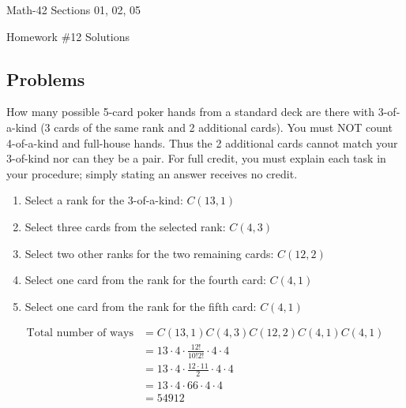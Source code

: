 \documentclass[letterpaper,12pt,fleqn]{article}
\begin{document}
\begin{center}
  \large
  Math-42 Sections 01, 02, 05

  \Large
  Homework \#12 Solutions
\end{center}

\subsection*{Problems}

How many possible 5-card poker hands from a standard deck are there with 3-of-a-kind (3 cards of the same rank and
2 additional cards).  You must NOT count 4-of-a-kind and full-house hands.  Thus the 2 additional cards cannot
match your 3-of-kind nor can they be a pair.  For full credit, you must explain each task in your procedure;
simply stating an answer receives no credit.

\begin{enumerate}
\item Select a rank for the 3-of-a-kind: \(C(13,1)\)
\item Select three cards from the selected rank: \(C(4,3)\)
\item Select two other ranks for the two remaining cards: \(C(12,2)\)
\item Select one card from the rank for the fourth card: \(C(4,1)\)
\item Select one card from the rank for the fifth card: \(C(4,1)\)
\end{enumerate}

\begin{align*}
  \text{Total number of ways} &= C(13,1)C(4,3)C(12,2)C(4,1)C(4,1) \\
  &= 13\cdot4\cdot\frac{12!}{10!2!}\cdot4\cdot4 \\
  &= 13\cdot4\cdot\frac{12\cdot11}{2}\cdot4\cdot4 \\
  &= 13\cdot4\cdot66\cdot4\cdot4 \\
  &= 54912
\end{align*}
\end{document}
